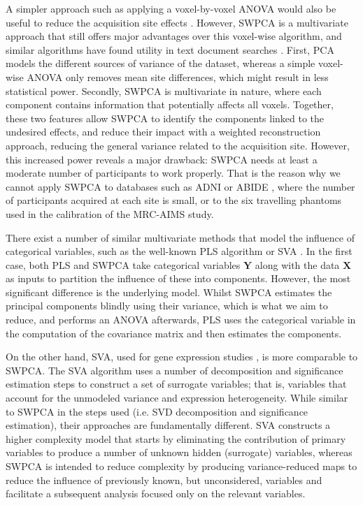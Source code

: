 A simpler approach such as applying a voxel-by-voxel \ac{ANOVA} would also be useful to reduce the acquisition site effects \cite{Suckling2012}. However, \ac{SWPCA} is a multivariate approach that still offers major advantages over this voxel-wise algorithm, and similar algorithms have found utility in text document searches \cite{Kriegel2008,tavoli2013}. First, \ac{PCA} models the different sources of variance of the dataset, whereas a simple voxel-wise \ac{ANOVA} only removes mean site differences, which might result in less statistical power. Secondly, \ac{SWPCA} is multivariate in nature, where each component contains information that potentially affects all voxels. Together, these two features allow \ac{SWPCA} to identify the components linked to the undesired effects, and reduce their impact with a weighted reconstruction approach, reducing the general variance related to the acquisition site. However, this increased power reveals a major drawback: \ac{SWPCA} needs at least a moderate number of participants to work properly. That is the reason why we cannot apply \ac{SWPCA} to databases such as \ac{ADNI} \cite{friedman2006report} or ABIDE \cite{DiMartino2014}, where the number of participants acquired at each site is small, or to the six travelling phantoms used in the calibration of the \ac{MRC-AIMS} study. 

There exist a number of similar multivariate methods that model the influence of categorical variables, such as the well-known \ac{PLS} algorithm \cite{vinzi2010} or \acf{SVA} \cite{Leek2007}. In the first case, both \ac{PLS} and \ac{SWPCA} take categorical variables $\mathbf{Y}$ along with the data $\mathbf{X}$ as inputs to partition the influence of these into components. However, the most significant difference is the underlying model. Whilst \ac{SWPCA} estimates the principal components blindly using their variance, which is what we aim to reduce, and performs an \ac{ANOVA} afterwards, \ac{PLS} uses the categorical variable in the computation of the covariance matrix and then estimates the components. 


On the other hand, \ac{SVA}, used for gene expression studies \cite{Leek2007}, is more comparable to \ac{SWPCA}. The \ac{SVA} algorithm uses a number of decomposition and significance estimation steps to construct a set of surrogate variables; that is, variables that account for the unmodeled variance and expression heterogeneity. While similar to \ac{SWPCA} in the steps used (i.e. \ac{SVD} decomposition and significance estimation), their approaches are fundamentally different. \ac{SVA} constructs a higher complexity model that starts by eliminating the contribution of primary variables to produce a number of unknown hidden (surrogate) variables, whereas \ac{SWPCA} is intended to reduce complexity by producing variance-reduced maps to reduce the influence of previously known, but unconsidered, variables and facilitate a subsequent analysis focused only on the relevant variables.

